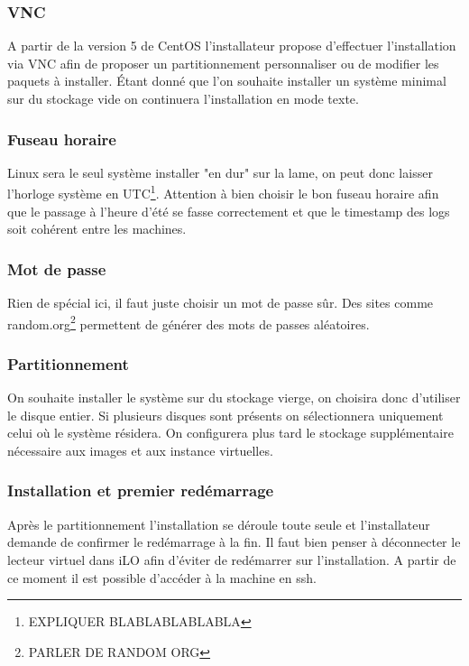 \documentclass[a4paper,oneside]{report}
\begin{document}
\subsubsection{VNC}
A partir de la version 5 de CentOS l'installateur propose d'effectuer l'installation via VNC afin de proposer un partitionnement personnaliser ou de modifier les paquets à installer.
Étant donné que l'on souhaite installer un système minimal sur du stockage vide on continuera l'installation en mode texte.

\subsubsection{Fuseau horaire}
Linux sera le seul système installer "en dur" sur la lame, on peut donc laisser l'horloge système en UTC\footnote{EXPLIQUER BLABLABLABLABLA}.
Attention à bien choisir le bon fuseau horaire afin que le passage à l'heure d'été se fasse correctement et que le timestamp des logs soit cohérent entre les machines.

\subsubsection{Mot de passe}
Rien de spécial ici, il faut juste choisir un mot de passe sûr. Des sites comme random.org\footnote{PARLER DE RANDOM ORG} permettent de générer des mots de passes aléatoires.

\subsubsection{Partitionnement}
On souhaite installer le système sur du stockage vierge, on choisira donc d'utiliser le disque entier.
Si plusieurs disques sont présents on sélectionnera uniquement celui où le système résidera.
On configurera plus tard le stockage supplémentaire nécessaire aux images et aux instance virtuelles.

\subsubsection{Installation et premier redémarrage}
Après le partitionnement l'installation se déroule toute seule et l'installateur demande de confirmer le redémarrage à la fin.
Il faut bien penser à déconnecter le lecteur virtuel dans iLO afin d'éviter de redémarrer sur l'installation.\newline
A partir de ce moment il est possible d'accéder à la machine en \gls{ssh}.
\end{document}
